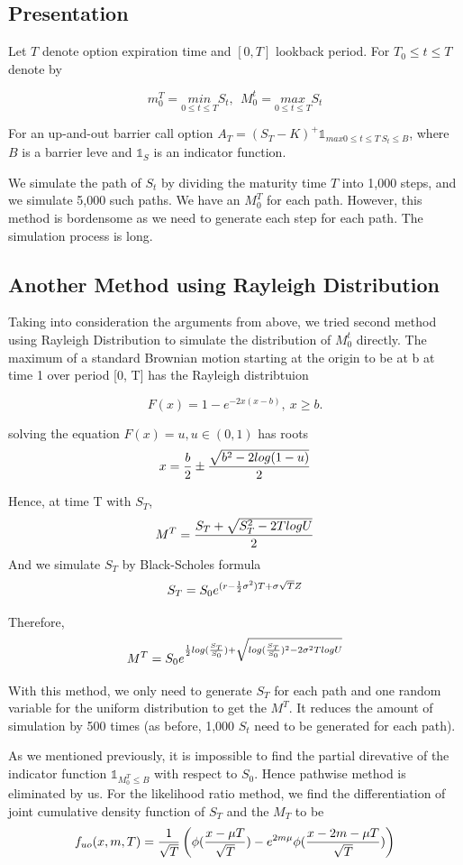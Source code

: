 \documentclass[11pt,a4paper,fleqn]{article}
\begin{document}
\subsection{Presentation}
Let $T$ denote option expiration time and $[0,T]$ lookback period. For $T_0 \leq t\leq T$ denote by

$$m^T_{0} =\underset{0 \leq t \leq T}{min}  S_t, \ \   M^t_{0} = \underset{0 \leq t \leq T}{max} S_t$$

For an up-and-out barrier call option $A_T=(S_T-K)^+\mathds{1}_{max 0\leq t\leq T \  S_t\leq B}$, where $B$ is a barrier leve and $\mathds{1}_S$ is an indicator function.

We simulate the path of $S_t$ by dividing the maturity time $T$ into 1,000 steps, and we simulate 5,000 such paths. We have an $M^T_0$ for each path. However, this method is bordensome as we need to generate each step for each path. The simulation process is long.

\subsection{Another Method using Rayleigh Distribution}
Taking into consideration the arguments from above, we tried second method using Rayleigh Distribution to simulate the distribution of $M^t_0$ directly. The maximum of a standard Brownian motion starting at the origin to be at b at time 1 over period [0, T] has the Rayleigh distribtuion \cite{barrieropt, glasserman, exooptions}

$$F(x) = 1 - e^{-2x(x-b)}, \ x \geq b.$$

solving the equation $F(x) = u, u\in (0,1)$ has roots
$$x = {b \over 2} \pm {\sqrt{b^2-2log(1-u)}\over 2}$$

Hence, at time T with $S_T$,
$$M^T={S_T+\sqrt{S_T^2-2TlogU}\over 2}$$
And we simulate $S_T$ by Black-Scholes formula
$$S_T=S_0e^{(r-{1\over 2}\sigma^2)T+\sigma \sqrt{T}Z}$$

Therefore,
$$M^T=S_0e^{{1\over2}log({S_T\over S_0})+\sqrt{log({S_T\over S_0})^2-2\sigma^2TlogU}}$$

With this method, we only need to generate $S_T$ for each path and one random variable for the uniform distribution to get the $M^T$. It reduces the amount of simulation by 500 times (as before, 1,000 $S_t$ need to be generated for each path).

As we mentioned previously, it is impossible to find the partial direvative of the indicator function $\mathds{1}_{M^T_0\leq B}$  with respect to $S_0$. Hence pathwise method is eliminated by us. For the likelihood ratio method, we find the differentiation of joint cumulative density function of $S_T$ and the  $M_T $ to be
$$f_{uo}(x, m, T)={1\over \sqrt{T}}\left(\phi({x-\mu T \over \sqrt{T}})-e^{2m\mu} \phi({x-2m-\mu T\over \sqrt{T}})\right) $$
\end{document}
